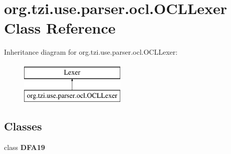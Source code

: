 \hypertarget{classorg_1_1tzi_1_1use_1_1parser_1_1ocl_1_1_o_c_l_lexer}{\section{org.\-tzi.\-use.\-parser.\-ocl.\-O\-C\-L\-Lexer Class Reference}
\label{classorg_1_1tzi_1_1use_1_1parser_1_1ocl_1_1_o_c_l_lexer}
}
Inheritance diagram for org.\-tzi.\-use.\-parser.\-ocl.\-O\-C\-L\-Lexer\-:\begin{figure}[H]
\begin{center}
\leavevmode
\includegraphics[height=2.000000cm]{classorg_1_1tzi_1_1use_1_1parser_1_1ocl_1_1_o_c_l_lexer}
\end{center}
\end{figure}
\subsection*{Classes}
\begin{DoxyCompactItemize}
\item 
class {\bfseries D\-F\-A19}
\end{DoxyCompactItemize}
